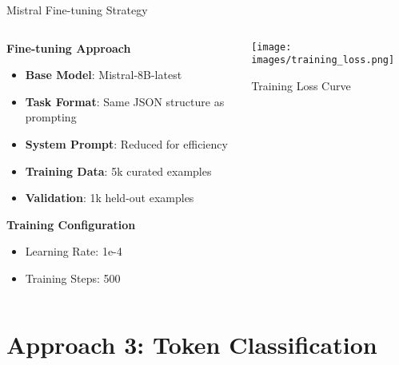 \documentclass[aspectratio=169]{beamer}
\begin{document}
\begin{frame}{Mistral Fine-tuning Strategy}
\begin{columns}
\begin{column}{0.6\textwidth}
\textbf{Fine-tuning Approach}
\begin{itemize}
\item \textbf{Base Model}: Mistral-8B-latest
\item \textbf{Task Format}: Same JSON structure as prompting
\item \textbf{System Prompt}: Reduced for efficiency
\item \textbf{Training Data}: 5k curated examples
\item \textbf{Validation}: 1k held-out examples
\end{itemize}

\vspace{0.3cm}
\textbf{Training Configuration}
\begin{itemize}
\item Learning Rate: 1e-4
\item Training Steps: 500
\end{itemize}
\end{column}
\begin{column}{0.4\textwidth}
\begin{center}
\texttt{[image: images/training\_loss.png]}
\caption{Training Loss Curve}
\end{center}
\end{column}
\end{columns}
\end{frame}


\section{Approach 3: Token Classification}
\end{document}
